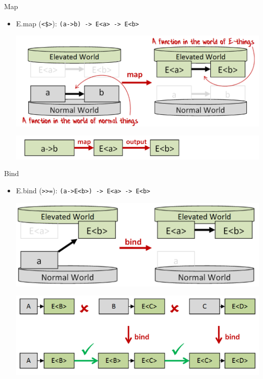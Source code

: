 \documentclass[t]{beamer}
\begin{document}
\begin{frame}[label={sec:org428be94},fragile]{Map}
 \begin{itemize}
\item E.map (\texttt{<\$>}): \texttt{(a->b) -> E<a> -> E<b>}
\begin{center}
\includegraphics[width=.9\linewidth]{./../img/vgfp_map.png}
\end{center}
\begin{center}
\includegraphics[width=.9\linewidth]{./../img/vgfp_map2.png}
\end{center}
\end{itemize}
\end{frame}

\begin{frame}[label={sec:org0708048},fragile]{Bind}
 \begin{itemize}
\item E.bind (\texttt{>>=}): \texttt{(a->E<b>) -> E<a> -> E<b>}
\begin{center}
\includegraphics[width=.9\linewidth]{./../img/vgfp_bind.png}
\end{center}
\begin{center}
\includegraphics[width=.9\linewidth]{./../img/vgfp_bind_composition.png}
\end{center}
\end{itemize}
\end{frame}
\end{document}
